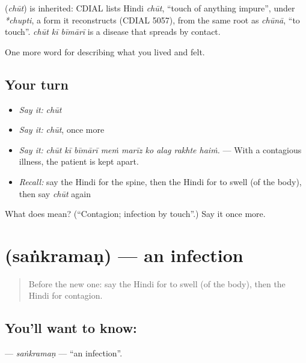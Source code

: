 \begin{cousinweb}
\textbf{} (\emph{chūt}) is inherited: CDIAL lists Hindi \emph{chūt}, \textquotedblleft{}touch of anything impure\textquotedblright{}, under \emph{*chupti}, a form it reconstructs (CDIAL 5057), from the same root as \emph{chūnā}, \textquotedblleft{}to touch\textquotedblright{}. \emph{chūt kī bīmārī} is a disease that spreads by contact.
\end{cousinweb}

\begin{grammarlens}[title={What you've built}]
One more word for describing what you lived and felt.
\end{grammarlens}

\subsection*{Your turn}
\begin{itemize}
\raggedright
  \item \emph{Say it:} \emph{chūt}
  \item \emph{Say it:} \emph{chūt}, once more
  \item \emph{Say it:} \emph{chūt kī bīmārī meṁ marīz ko alag rakhte haiṁ.} — With a contagious illness, the patient is kept apart.
  \item \emph{Recall:} say the Hindi for the spine, then the Hindi for to swell (of the body), then say \emph{chūt} again
\end{itemize}

\begin{tcolorbox}[breakable,colback=teal!4,colframe=teal!35!black,title={Before you move on}]
What does  mean? (\textquotedblleft{}Contagion; infection by touch\textquotedblright{}.) Say it once more.
\end{tcolorbox}
\section[\texorpdfstring{\hi{संक्रमण} (saṅkramaṇ)}{संक्रमण (saṅkramaṇ)}]{ (saṅkramaṇ) — an infection}

\label{lesson:HI-C487-sankraman}



\begin{quote}
Before the new one: say the Hindi for to swell (of the body), then the Hindi for contagion.
\end{quote}

\subsection*{You'll want to know: }
\textbf{} — \emph{saṅkramaṇ} — \textquotedblleft{}an infection\textquotedblright{}.

